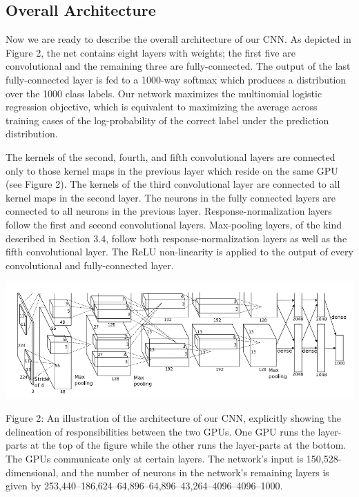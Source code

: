 \documentclass[12pt,a4paper,UTF8,twoside]{book}
\begin{document}
\hypertarget{overall-architecture}{%
\subsection{Overall Architecture}\label{overall-architecture}}

Now we are ready to describe the overall architecture of our CNN. As depicted in Figure 2, the net contains eight layers with weights; the first five are convolutional and the remaining three are fully-connected. The output of the last fully-connected layer is fed to a 1000-way softmax which produces a distribution over the 1000 class labels. Our network maximizes the multinomial logistic regression objective, which is equivalent to maximizing the average across training cases of the log-probability of the correct label under the prediction distribution.

The kernels of the second, fourth, and fifth convolutional layers are connected only to those kernel maps in the previous layer which reside on the same GPU (see Figure 2). The kernels of the third convolutional layer are connected to all kernel maps in the second layer. The neurons in the fully connected layers are connected to all neurons in the previous layer. Response-normalization layers follow the first and second convolutional layers. Max-pooling layers, of the kind described in Section 3.4, follow both response-normalization layers as well as the fifth convolutional layer. The ReLU non-linearity is applied to the output of every convolutional and fully-connected layer.

\begin{center}\includegraphics[width=0.7\linewidth]{img/01-02} \end{center}

Figure 2: An illustration of the architecture of our CNN, explicitly showing the delineation of responsibilities between the two GPUs. One GPU runs the layer-parts at the top of the figure while the other runs the layer-parts at the bottom. The GPUs communicate only at certain layers. The network's input is 150,528-dimensional, and the number of neurons in the network's remaining layers is given by 253,440--186,624--64,896--64,896--43,264--4096--4096--1000.
\end{document}
